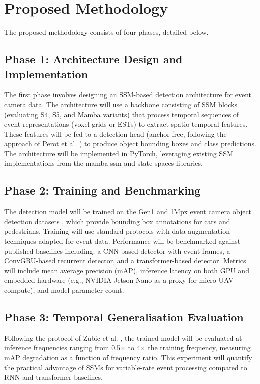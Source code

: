 \documentclass[11pt, a4paper]{report}
\begin{document}
\section{Proposed Methodology}
The proposed methodology consists of four phases, detailed below. 

\subsection{Phase 1: Architecture Design and Implementation}
The first phase involves designing an SSM-based detection architecture for event camera data. The architecture will use a backbone consisting of SSM blocks (evaluating S4, S5, and Mamba variants) that process temporal sequences of event representations (voxel grids or ESTs) to extract spatio-temporal features. These features will be fed to a detection head (anchor-free, following the approach of Perot et al. \cite{perot2020learning}) to produce object bounding boxes and class predictions. The architecture will be implemented in PyTorch, leveraging existing SSM implementations from the mamba-ssm and state-spaces libraries. 

\subsection{Phase 2: Training and Benchmarking}
The detection model will be trained on the Gen1 and 1Mpx event camera object detection datasets \cite{perot2020learning}, which provide bounding box annotations for cars and pedestrians. Training will use standard protocols with data augmentation techniques adapted for event data. Performance will be benchmarked against published baselines including: a CNN-based detector with event frames, a ConvGRU-based recurrent detector, and a transformer-based detector. Metrics will include mean average precision (mAP), inference latency on both GPU and embedded hardware (e.g., NVIDIA Jetson Nano as a proxy for micro UAV compute), and model parameter count. 

\subsection{Phase 3: Temporal Generalisation Evaluation}
Following the protocol of Zubic et al. \cite{zubic2024state}, the trained model will be evaluated at inference frequencies ranging from 0.5× to 4× the training frequency, measuring mAP degradation as a function of frequency ratio. This experiment will quantify the practical advantage of SSMs for variable-rate event processing compared to RNN and transformer baselines. 
\end{document}

